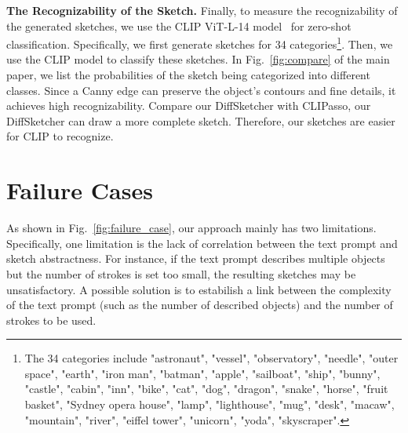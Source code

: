 \documentclass{article}
\begin{document}
\textbf{The Recognizability of the Sketch. } Finally, to measure the recognizability of the generated sketches, we use the CLIP ViT-L-14 model~\cite{clip_radford_2021} for zero-shot classification. Specifically, we first generate sketches for 34 categories\footnote{The 34 categories include "astronaut", "vessel", "observatory", "needle", "outer space", "earth", "iron man", "batman", "apple", "sailboat", "ship", "bunny", "castle", "cabin", "inn", "bike", "cat", "dog", "dragon", "snake", "horse", "fruit basket", "Sydney opera house", "lamp", "lighthouse", "mug", "desk", "macaw", "mountain", "river", "eiffel tower", "unicorn", "yoda", "skyscraper".}.
Then, we use the CLIP model to classify these sketches. In Fig.~\ref{fig:compare} of the main paper, we list the probabilities of the sketch being categorized into different classes. Since a Canny edge can preserve the object's contours and fine details, it achieves high recognizability. Compare our DiffSketcher with CLIPasso, our DiffSketcher can draw a more complete sketch. Therefore, our sketches are easier for CLIP to recognize.

\section{Failure Cases}
\label{supp:failure_case}
As shown in Fig.~\ref{fig:failure_case}, our approach mainly has two limitations. Specifically, one limitation is the lack of correlation between the text prompt and sketch abstractness. For instance, if the text prompt describes multiple objects but the number of strokes is set too small, the resulting sketches may be unsatisfactory. A possible solution is to estabilish a link between the complexity of the text prompt (such as the number of described objects) and the number of strokes to be used.
\end{document}
